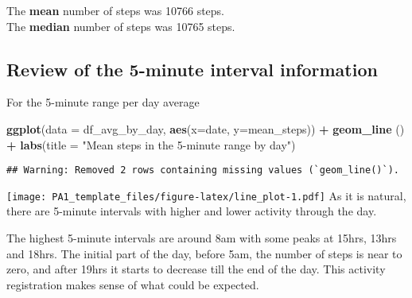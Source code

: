 \documentclass[
]{article}
\newenvironment{Shaded}{\begin{snugshade}}{\end{snugshade}}
\newcommand{\AttributeTok}[1]{\textcolor[rgb]{0.13,0.29,0.53}{#1}}
\newcommand{\FunctionTok}[1]{\textcolor[rgb]{0.13,0.29,0.53}{\textbf{#1}}}
\newcommand{\NormalTok}[1]{#1}
\newcommand{\OtherTok}[1]{\textcolor[rgb]{0.56,0.35,0.01}{#1}}
\newcommand{\SpecialCharTok}[1]{\textcolor[rgb]{0.81,0.36,0.00}{\textbf{#1}}}
\newcommand{\StringTok}[1]{\textcolor[rgb]{0.31,0.60,0.02}{#1}}
\begin{document}
The \textbf{mean} number of steps was 10766 steps.\\
The \textbf{median} number of steps was 10765 steps.

\hypertarget{review-of-the-5-minute-interval-information}{%
\subsection{Review of the 5-minute interval
information}\label{review-of-the-5-minute-interval-information}}

\begin{Shaded}
\end{Shaded}

For the 5-minute range per day average

\begin{Shaded}
\begin{Highlighting}[]
\FunctionTok{ggplot}\NormalTok{(}\AttributeTok{data =}\NormalTok{ df\_avg\_by\_day, }\FunctionTok{aes}\NormalTok{(}\AttributeTok{x=}\NormalTok{date, }\AttributeTok{y=}\NormalTok{mean\_steps)) }\SpecialCharTok{+}
  \FunctionTok{geom\_line}\NormalTok{ () }\SpecialCharTok{+}
  \FunctionTok{labs}\NormalTok{(}\AttributeTok{title =} \StringTok{"Mean steps in the 5{-}minute range by day"}\NormalTok{)}
\end{Highlighting}
\end{Shaded}

\begin{verbatim}
## Warning: Removed 2 rows containing missing values (`geom_line()`).
\end{verbatim}

\texttt{[image: PA1\_template\_files/figure-latex/line\_plot-1.pdf]} As it
is natural, there are 5-minute intervals with higher and lower activity
through the day.

The highest 5-minute intervals are around 8am with some peaks at 15hrs,
13hrs and 18hrs. The initial part of the day, before 5am, the number of
steps is near to zero, and after 19hrs it starts to decrease till the
end of the day. This activity registration makes sense of what could be
expected.
\end{document}
